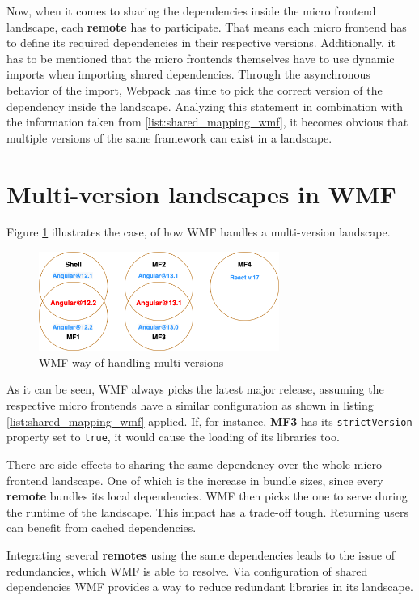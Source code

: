 Now, when it comes to sharing the dependencies inside the micro frontend landscape, each \textbf{remote} has to participate. That means each micro frontend has to define its required dependencies in their respective versions. Additionally, it has to be mentioned that the micro frontends themselves have to use dynamic imports when importing shared dependencies. Through the asynchronous behavior of the import, Webpack has time to pick the correct version of the dependency inside the landscape.\cite{wmf_concepts}
Analyzing this statement in combination with the information taken from \ref{list:shared_mapping_wmf}, it becomes obvious that multiple versions of the same framework can exist in a landscape. 

\section{Multi-version landscapes in WMF}

Figure \ref{fig:wmf_multiversions} illustrates the case, of how WMF handles a multi-version landscape.

\begin{figure}[!h]
	\centering
	\includegraphics[width=0.7\textwidth]{Figures/multi_version_diagramm.drawio.png}
	\caption{WMF way of handling multi-versions}
	\label{fig:wmf_multiversions}
\end{figure}

As it can be seen, WMF always picks the latest major release, assuming the respective micro frontends have a similar configuration as shown in listing \ref{list:shared_mapping_wmf} applied. If, for instance, \textbf{MF3} has its \texttt{strictVersion} property set to \texttt{true}, it would cause the loading of its libraries too.

There are side effects to sharing the same dependency over the whole micro frontend landscape. One of which is the increase in bundle sizes, since every \textbf{remote} bundles its local dependencies. WMF then picks the one to serve during the runtime of the landscape.
This impact has a trade-off tough. Returning users can benefit from cached dependencies.\cite{wmf_multi_versions}

Integrating several \textbf{remotes} using the same dependencies leads to the issue of redundancies, which WMF is able to resolve. Via configuration of shared dependencies WMF provides a way to reduce redundant libraries in its landscape.